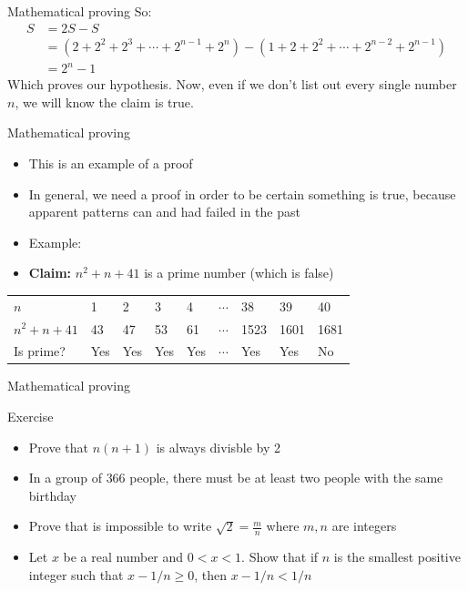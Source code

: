 \documentclass[10pt,xcolor={table,dvipsnames},t]{beamer}
\begin{document}
\begin{frame}{Mathematical proving}
  So:
  \begin{align*}
    S &= 2S - S\\
    &= (2 + 2^2 + 2^3 + \cdots + 2^{n-1} + 2^{n}) - (1 + 2 + 2^2 + \cdots + 2^{n-2} + 2^{n-1})\\
    &= 2^n - 1
  \end{align*}
  Which proves our hypothesis. Now, even if we don't list out every single number $n$, we will know the claim is true.
\end{frame}

\begin{frame}{Mathematical proving}
  \begin{itemize}
    \item This is an example of a proof
    \item In general, we need a proof in order to be certain something is true, because apparent patterns can and had failed in the past 
    \item Example:
    \item \textbf{Claim:} $n^2 + n + 41$ is a prime number (which is false)
  \end{itemize}  
  \begin{table}[]
    \begin{tabular}{lllllllll}
    $n$        & 1   & 2   & 3   & 4   & $\cdots$ & 38   & 39   & 40   \\
    $n^2+n+41$ & 43  & 47  & 53  & 61  & $\cdots$ & 1523 & 1601 & 1681 \\
    Is prime?  & Yes & Yes & Yes & Yes & $\cdots$ & Yes  & Yes  & No  
    \end{tabular}
    \end{table}
\end{frame}

\begin{frame}{Mathematical proving}
  \begin{exampleblock}{Exercise}
    \begin{itemize}
      \item Prove that $n(n+1)$ is always divisble by 2
      \item In a group of $366$ people, there must be at least two people with the same birthday
      \item Prove that is impossible to write $\sqrt{2} = \frac{m}{n}$ where $m,n$ are integers
      \item Let $x$ be a real number and $0<x<1$. Show that if $n$ is the smallest positive integer such that $x-1/n \geq 0$, then $x-1/n < 1/n$
    \end{itemize}
  \end{exampleblock}
\end{frame}
\end{document}
